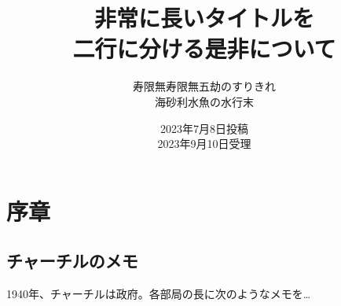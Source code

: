 \documentclass{jlreq}
\begin{document}
\title{非常に長いタイトルを \\ 二行に分ける是非について}
\author{寿限無寿限無五劫のすりきれ \\ 海砂利水魚の水行末}
\date{2023年7月8日投稿 \\ 2023年9月10日受理}
\maketitle

\section{序章}
\subsection{チャーチルのメモ}
 1940年、チャーチルは政府。各部局の長に次のようなメモを…
\end{document}
